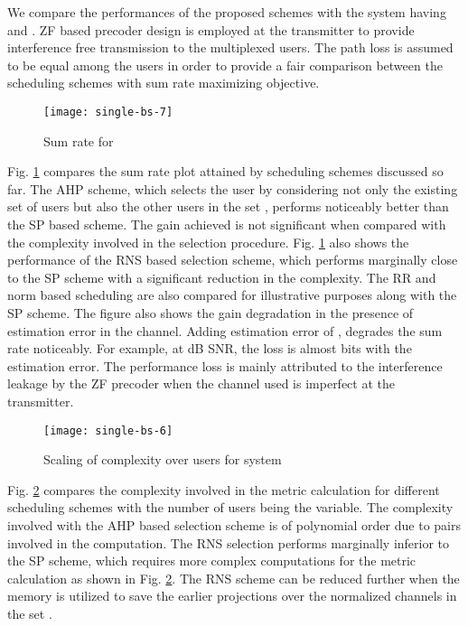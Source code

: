 We compare the performances of the proposed schemes with the system having  and . ZF based precoder design is employed at the transmitter to provide interference free transmission to the multiplexed users. The path loss is assumed to be equal among the users in order to provide a fair comparison between the scheduling schemes with sum rate maximizing objective.
\begin{figure}
\centering
\texttt{[image: single-bs-7]}
\vspace{-0.2in}
\caption[short]{Sum rate for }
\vspace{-0.1in}
\label{single-bs-f1}
\end{figure}

Fig. \ref{single-bs-f1} compares the sum rate plot attained by scheduling schemes discussed so far. The \ac{AHP} scheme, which selects the user by considering not only the existing set of users  but also the other users in the set , performs noticeably better than the SP based scheme.  The gain achieved is not significant when compared with the complexity involved in the selection procedure. Fig. \ref{single-bs-f1} also shows the performance of the \ac{RNS} based selection scheme, which performs marginally close to the SP scheme with a significant reduction in the complexity. The \ac{RR} and norm based scheduling are also compared for illustrative purposes along with the \ac{SP} scheme. The figure also shows the gain degradation in the presence of estimation error in the channel. Adding estimation error of , degrades the sum rate noticeably. For example, at  dB SNR, the loss is almost  bits with the estimation error. The performance loss is mainly attributed to the interference leakage by the \ac{ZF} precoder when the channel used is imperfect at the transmitter.
\begin{figure}
\centering
\texttt{[image: single-bs-6]}
\vspace{-0.2in}
\caption[short]{Scaling of complexity over users for  system}
\vspace{-0.1in}
\label{single-bs-f2}
\end{figure}

Fig. \ref{single-bs-f2} compares the complexity involved in the metric calculation for different scheduling schemes with the number of users being the variable. The complexity involved with the \ac{AHP} based selection scheme is of polynomial order due to  pairs involved in the computation. The \ac{RNS} selection performs marginally inferior to the SP scheme, which requires more complex computations for the metric calculation as shown in Fig. \ref{single-bs-f2}. The \ac{RNS} scheme can be reduced further when the memory is utilized to save the earlier projections over the normalized channels in the set .

